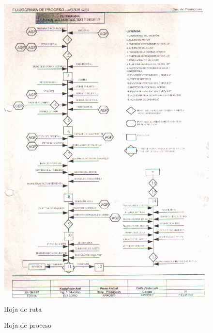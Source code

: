\documentclass[a4paper,oneside,11pt]{article}
\begin{document}
\begin{figure} [ht!]
    \centering
    \includegraphics[scale=1.3]{hojaruta.png}
    \caption{Hoja de ruta}
    \label{fig:hojaruta}
\end{figure}

\begin{figure} [ht!]
    \centering
    \caption{Hoja de proceso}
    \label{fig:hoja de proceso}
\end{figure}
\end{document}
